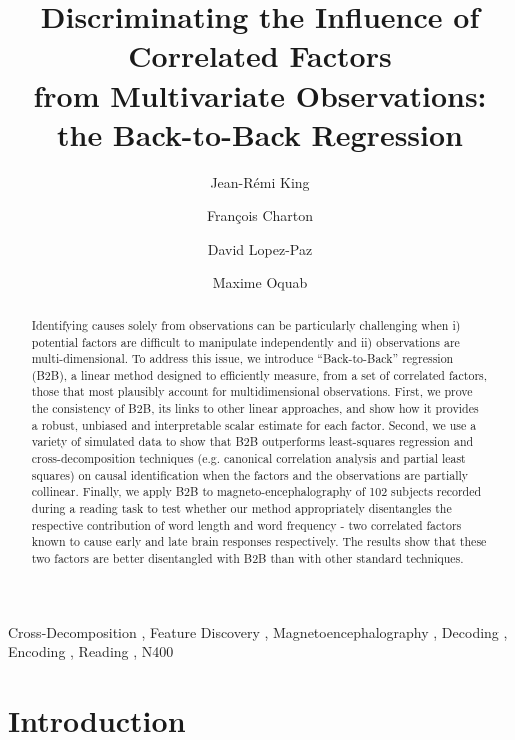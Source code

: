 \documentclass[preprint,12pt,3p]{elsarticle}
\begin{document}
\begin{frontmatter}

\title{Discriminating the Influence of Correlated Factors \\from Multivariate Observations: the Back-to-Back Regression}

\author[1,2]{Jean-Rémi King}

\author[2]{Fran\c{c}ois Charton}
\author[2]{David Lopez-Paz}
\author[2]{Maxime Oquab}
\address[1]{Laboratoire des systèmes perceptifs, PSL University, CNRS}
\address[2]{Facebook AI}


\begin{abstract}
Identifying causes solely from observations can be particularly challenging when
i) potential factors are difficult to manipulate independently and ii)
observations are multi-dimensional. To address this issue, we
introduce ``Back-to-Back'' regression (B2B), a linear method designed to efficiently
measure, from a set of correlated factors, those that most plausibly account for
multidimensional observations. First, we prove the consistency of B2B, its links to
other linear approaches, and show how it provides a robust, unbiased and
interpretable scalar estimate for each factor.
Second, we use a variety of simulated data to show that B2B outperforms
least-squares regression and cross-decomposition techniques (e.g. canonical
correlation analysis and partial least squares) on causal identification when
the factors and the observations are partially collinear.
Finally, we apply B2B to magneto-encephalography of 102 subjects
recorded during a reading task to test whether our method appropriately disentangles
the respective contribution of word length and word frequency - two correlated
factors known to cause early and late brain responses respectively. The results
show that these two factors are better disentangled with B2B than with
other standard techniques.
\end{abstract}


\begin{keyword}
  Cross-Decomposition \sep
  Feature Discovery \sep
  Magnetoencephalography \sep
  Decoding \sep
  Encoding \sep
  Reading \sep
  N400
\end{keyword}

\end{frontmatter}

\linenumbers

\section{Introduction}

\end{document}
